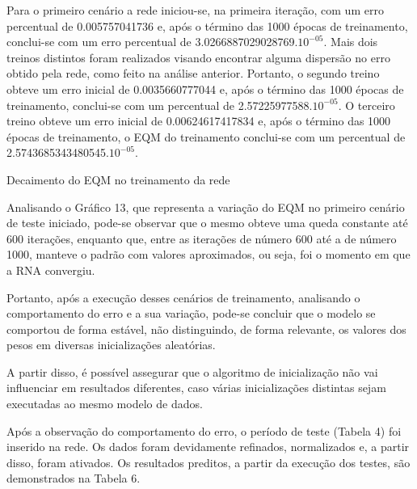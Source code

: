Para o primeiro cenário a rede iniciou-se, na primeira iteração, com um erro percentual de 0.005757041736 e, após o término das 1000 épocas de treinamento, conclui-se com um erro percentual de 3.0266887029028769.$10^{-05}$. Mais dois treinos distintos foram realizados visando encontrar alguma dispersão no erro obtido pela rede, como feito na análise anterior. Portanto, o segundo treino obteve um erro inicial de 0.0035660777044 e, após o término das 1000 épocas de treinamento, conclui-se com um percentual de 2.57225977588.$10^{-05}$. O terceiro treino obteve um erro inicial de 0.00624617417834 e, após o término das 1000 épocas de treinamento, o EQM do treinamento conclui-se com um percentual de 2.5743685343480545.$10^{-05}$.
\begin{grafico}[h]
	\centering
	\caption{Decaimento do EQM no treinamento da rede}
	\label{lingua}
\end{grafico}

Analisando o Gráfico 13, que representa a variação do EQM no primeiro cenário de teste iniciado, pode-se observar que o mesmo obteve uma queda constante até 600 iterações, enquanto que, entre as iterações de número 600 até a de número 1000, manteve o padrão com valores aproximados, ou seja, foi o momento em que a RNA convergiu. 

Portanto, após a execução desses cenários de treinamento, analisando o comportamento do erro e a sua variação, pode-se concluir que o modelo se comportou de forma estável, não distinguindo, de forma relevante, os valores dos pesos em diversas inicializações aleatórias.

A partir disso, é possível assegurar que o algoritmo de inicialização não vai influenciar em resultados diferentes, caso várias inicializações distintas sejam executadas ao mesmo modelo de dados. 

Após a observação do comportamento do erro, o período de teste (Tabela 4) foi inserido na rede. Os dados foram devidamente refinados, normalizados e, a partir disso, foram ativados. Os resultados preditos, a partir da execução dos testes, são demonstrados na Tabela 6. 

